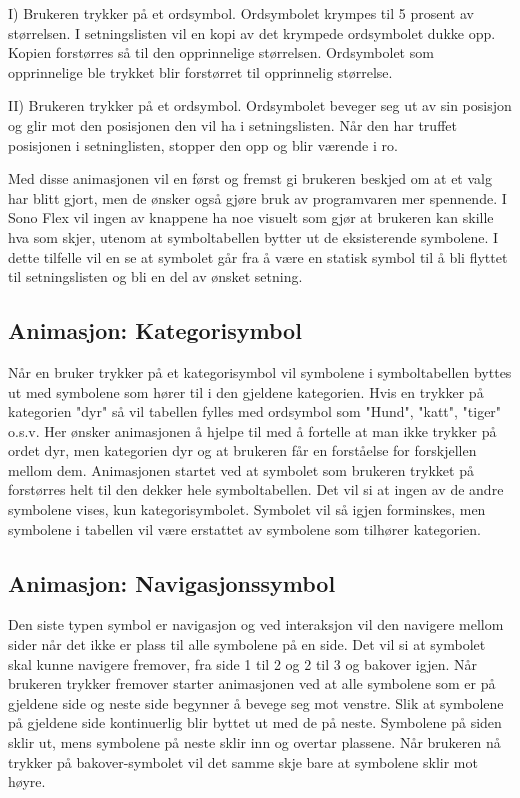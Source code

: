 I) Brukeren trykker på et ordsymbol.
   Ordsymbolet krympes til 5 prosent av størrelsen.
   I setningslisten vil en kopi av det krympede ordsymbolet dukke opp.
   Kopien forstørres så til den opprinnelige størrelsen.
   Ordsymbolet som opprinnelige ble trykket blir forstørret til opprinnelig størrelse.

   
II) Brukeren trykker på et ordsymbol.
    Ordsymbolet beveger seg ut av sin posisjon og glir mot den posisjonen den vil ha i setningslisten.
    Når den har truffet posisjonen i setninglisten, stopper den opp og blir værende i ro.

    Med disse animasjonen vil en først og fremst gi brukeren beskjed om at et valg har blitt gjort, men de ønsker også gjøre bruk av programvaren mer spennende.  I Sono Flex  vil ingen av knappene ha noe visuelt som gjør at brukeren kan skille hva som skjer, utenom at symboltabellen bytter ut de eksisterende symbolene. I dette tilfelle vil en se at symbolet går fra å være en statisk symbol til å bli flyttet til setningslisten og bli en del av ønsket setning. 



\subsection{Animasjon: Kategorisymbol}

Når en bruker trykker på et kategorisymbol vil symbolene i symboltabellen byttes ut med symbolene som hører til i den gjeldene kategorien. Hvis en trykker på kategorien "dyr" så vil tabellen fylles med ordsymbol som "Hund", "katt", "tiger" o.s.v. Her ønsker animasjonen å hjelpe til med å fortelle at man ikke trykker på ordet dyr, men kategorien dyr og at brukeren får en forståelse for forskjellen mellom dem. Animasjonen startet ved at symbolet som brukeren trykket på forstørres helt til den dekker hele symboltabellen. Det vil si at ingen av de andre symbolene vises, kun kategorisymbolet. Symbolet vil så igjen forminskes, men symbolene i tabellen vil være erstattet av symbolene som tilhører kategorien. 


\subsection{Animasjon: Navigasjonssymbol}


Den siste typen symbol er navigasjon og ved interaksjon vil den navigere mellom sider når det ikke er plass til alle symbolene på en side. Det vil si at symbolet skal kunne navigere fremover, fra side 1 til 2 og 2 til 3 og bakover igjen. Når brukeren trykker fremover starter animasjonen ved at alle symbolene som er på gjeldene side og neste side begynner å bevege seg mot venstre. Slik at symbolene på gjeldene side kontinuerlig blir byttet ut med de på neste. Symbolene på siden sklir ut, mens symbolene på neste sklir inn og overtar plassene. Når brukeren nå trykker på bakover-symbolet vil det samme skje bare at symbolene sklir mot høyre.




